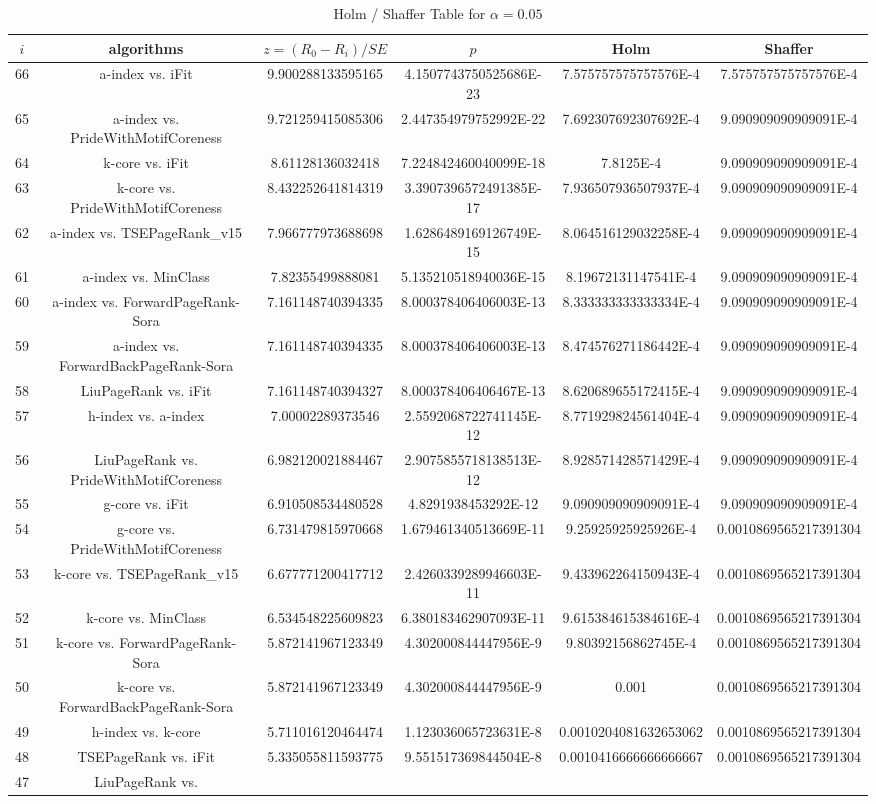 \documentclass[a4paper,10pt]{article}
\begin{document}
\begin{landscape}
\begin{table}[!htp]
\centering\tiny
\caption{Holm / Shaffer Table for $\alpha=0.05$}
\begin{tabular}{cccccc}
$i$&algorithms&$z=(R_0 - R_i)/SE$&$p$&Holm&Shaffer\\
\hline
66&a-index vs. iFit&9.900288133595165&4.1507743750525686E-23&7.575757575757576E-4&7.575757575757576E-4\\65&a-index vs. PrideWithMotifCoreness&9.721259415085306&2.447354979752992E-22&7.692307692307692E-4&9.090909090909091E-4\\64&k-core vs. iFit&8.61128136032418&7.224842460040099E-18&7.8125E-4&9.090909090909091E-4\\63&k-core vs. PrideWithMotifCoreness&8.432252641814319&3.3907396572491385E-17&7.936507936507937E-4&9.090909090909091E-4\\62&a-index vs. TSEPageRank_v15&7.966777973688698&1.6286489169126749E-15&8.064516129032258E-4&9.090909090909091E-4\\61&a-index vs. MinClass&7.82355499888081&5.135210518940036E-15&8.19672131147541E-4&9.090909090909091E-4\\60&a-index vs. ForwardPageRank-Sora&7.161148740394335&8.000378406406003E-13&8.333333333333334E-4&9.090909090909091E-4\\59&a-index vs. ForwardBackPageRank-Sora&7.161148740394335&8.000378406406003E-13&8.474576271186442E-4&9.090909090909091E-4\\58&LiuPageRank vs. iFit&7.161148740394327&8.000378406406467E-13&8.620689655172415E-4&9.090909090909091E-4\\57&h-index vs. a-index&7.00002289373546&2.5592068722741145E-12&8.771929824561404E-4&9.090909090909091E-4\\56&LiuPageRank vs. PrideWithMotifCoreness&6.982120021884467&2.9075855718138513E-12&8.928571428571429E-4&9.090909090909091E-4\\55&g-core vs. iFit&6.910508534480528&4.8291938453292E-12&9.090909090909091E-4&9.090909090909091E-4\\54&g-core vs. PrideWithMotifCoreness&6.731479815970668&1.679461340513669E-11&9.25925925925926E-4&0.0010869565217391304\\53&k-core vs. TSEPageRank_v15&6.677771200417712&2.4260339289946603E-11&9.433962264150943E-4&0.0010869565217391304\\52&k-core vs. MinClass&6.534548225609823&6.380183462907093E-11&9.615384615384616E-4&0.0010869565217391304\\51&k-core vs. ForwardPageRank-Sora&5.872141967123349&4.302000844447956E-9&9.80392156862745E-4&0.0010869565217391304\\50&k-core vs. ForwardBackPageRank-Sora&5.872141967123349&4.302000844447956E-9&0.001&0.0010869565217391304\\49&h-index vs. k-core&5.711016120464474&1.123036065723631E-8&0.0010204081632653062&0.0010869565217391304\\48&TSEPageRank vs. iFit&5.335055811593775&9.551517369844504E-8&0.0010416666666666667&0.0010869565217391304\\47&LiuPageRank vs. 
\end{tabular}
\end{table}
\end{landscape}
\end{document}
